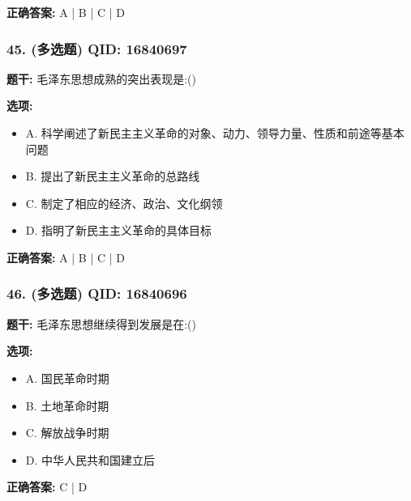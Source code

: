 \documentclass[12pt,UTF8]{ctexart}
\begin{document}
\textbf{正确答案:}
A | B | C | D

\vspace{0.3em}\hrulefill\vspace{0.7em}

\subsubsection*{45. (多选题) \small QID: 16840697}

\textbf{题干:}
毛泽东思想成熟的突出表现是:()

\textbf{选项:}
\begin{itemize}[leftmargin=*]

  \item A. 科学阐述了新民主主义革命的对象、动力、领导力量、性质和前途等基本问题

  \item B. 提出了新民主主义革命的总路线

  \item C. 制定了相应的经济、政治、文化纲领

  \item D. 指明了新民主主义革命的具体目标

\end{itemize}

\textbf{正确答案:}
A | B | C | D

\vspace{0.3em}\hrulefill\vspace{0.7em}

\subsubsection*{46. (多选题) \small QID: 16840696}

\textbf{题干:}
毛泽东思想继续得到发展是在:()

\textbf{选项:}
\begin{itemize}[leftmargin=*]

  \item A. 国民革命时期

  \item B. 土地革命时期

  \item C. 解放战争时期

  \item D. 中华人民共和国建立后

\end{itemize}

\textbf{正确答案:}
C | D
\end{document}
